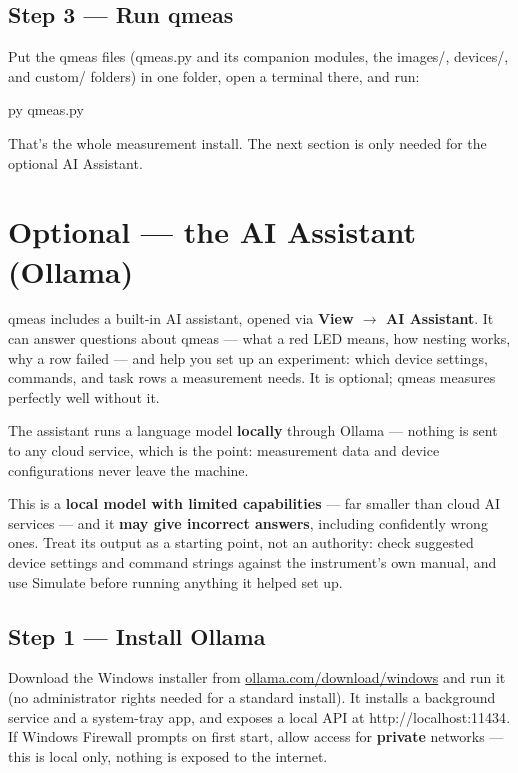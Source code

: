 \documentclass[11pt,a4paper]{article}
\newcommand{\code}[1]{{\ttfamily\color{qcode}#1}}
\begin{document}
\subsection{Step 3 --- Run qmeas}

Put the qmeas files (\code{qmeas.py} and its companion modules, the
\code{images/}, \code{devices/}, and \code{custom/} folders) in one folder,
open a terminal there, and run:

\begin{cmd}
py qmeas.py
\end{cmd}

That's the whole measurement install. The next section is only needed for
the optional AI Assistant.

\section{Optional --- the AI Assistant (Ollama)}
\label{sec:assistant}

qmeas includes a built-in AI assistant, opened via \textbf{View $\rightarrow$
AI Assistant}. It can answer questions about qmeas --- what a red LED means,
how nesting works, why a row failed --- and help you set up an experiment:
which device settings, commands, and task rows a measurement needs. It is
optional; qmeas measures perfectly well without it.

The assistant runs a language model \textbf{locally} through Ollama --- nothing
is sent to any cloud service, which is the point: measurement data and device
configurations never leave the machine.

\begin{warn}
This is a \textbf{local model with limited capabilities} --- far smaller than
cloud AI services --- and it \textbf{may give incorrect answers}, including
confidently wrong ones. Treat its output as a starting point, not an
authority: check suggested device settings and command strings against the
instrument's own manual, and use Simulate before running anything it helped
set up.
\end{warn}

\subsection{Step 1 --- Install Ollama}

Download the Windows installer from
\href{https://ollama.com/download/windows}{ollama.com/download/windows} and
run it (no administrator rights needed for a standard install). It installs a
background service and a system-tray app, and exposes a local API at
\code{http://localhost:11434}. If Windows Firewall prompts on first start,
allow access for \textbf{private} networks --- this is local only, nothing is
exposed to the internet.
\end{document}

